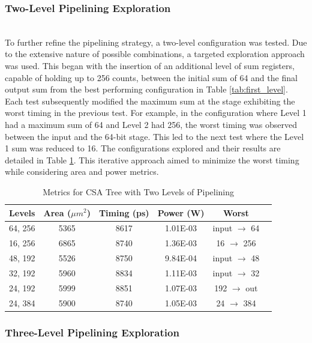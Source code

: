 \documentclass[conference]{IEEEtran}
\begin{document}
\subsubsection{Two-Level Pipelining Exploration}
\hfill\\

To further refine the pipelining strategy, a two-level configuration was tested. Due to the extensive nature of possible combinations, a targeted exploration approach was used. This began with the insertion of an additional level of sum registers, capable of holding up to 256 counts, between the initial sum of 64 and the final output sum from the best performing configuration in Table \ref{tab:first_level}. Each test subsequently modified the maximum sum at the stage exhibiting the worst timing in the previous test. For example, in the configuration where Level 1 had a maximum sum of 64 and Level 2 had 256, the worst timing was observed between the input and the 64-bit stage. This led to the next test where the Level 1 sum was reduced to 16. The configurations explored and their results are detailed in Table \ref{tab:two_level}. This iterative approach aimed to minimize the worst timing while considering area and power metrics.


\begin{table}[h]
    \centering
    \caption{Metrics for CSA Tree with Two Levels of Pipelining}
    \label{tab:two_level}
    \begin{tabular}{@{}cccccc@{}}
        \toprule
        \textbf{Levels} & \textbf{Area ($\mu m^2$)} & \textbf{Timing (ps)} & \textbf{Power (W)} & \textbf{Worst} \\
        \midrule
        64, 256 & 5365 & 8617 & 1.01E-03 & input $\rightarrow$ 64 \\
        16, 256 & 6865 & 8740 & 1.36E-03 & 16 $\rightarrow$ 256 \\
        48, 192 & 5526 & 8750 & 9.84E-04 & input $\rightarrow$ 48 \\
        32, 192 & 5960 & 8834 & 1.11E-03 & input $\rightarrow$ 32 \\
        24, 192 & 5999 & 8851 & 1.07E-03 & 192 $\rightarrow$ out\\
        24, 384 & 5900 & 8740 & 1.05E-03 & 24 $\rightarrow$ 384 \\
        \bottomrule
    \end{tabular}
\end{table}

\subsubsection{Three-Level Pipelining Exploration}
\hfill\\
\end{document}
